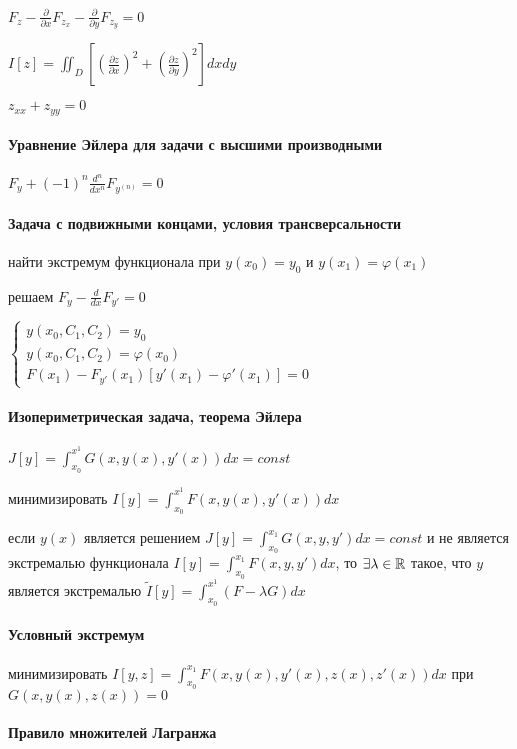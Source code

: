 \documentclass[russian,twocolumn]{article}
\begin{document}
$F_z - \frac{\partial}{\partial x}F_{z_x}-\frac{\partial}{\partial y}F_{z_y} = 0$

$I[z]=\iint_D [(\frac{\partial z}{\partial x})^2 + (\frac{\partial z}{\partial y})^2] dx dy$

$z_{xx} + z_{yy} = 0$

\paragraph{Уравнение Эйлера для задачи с высшими производными}

$F_y + (-1)^n \frac{d^n}{dx^n}F_{y^{(n)}}=0$

\paragraph{Задача с подвижными концами, условия трансверсальности}

найти экстремум функционала при $y(x_0) = y_0$ и $y(x_1) = \varphi(x_1)$

решаем $F_y - \frac{d}{dx}F_{y'}=0$

$\begin{cases}
y(x_0, C_1, C_2) = y_0 \\
y(x_0, C_1, C_2) = \varphi(x_0) \\
F(x_1)-F_{y'}(x_1)[y'(x_1)-\varphi'(x_1)] = 0
\end{cases}$

\paragraph{Изопериметрическая задача, теорема Эйлера}

$J[y]=\int_{x_0}^{x^1}G(x,y(x),y'(x))dx=const$

минимизировать $I[y]=\int_{x_0}^{x^1}F(x,y(x),y'(x))dx$
 
если $y(x)$ является решением $J[y]=\int_{x_0}^{x_1}G(x, y, y')dx = const$ и не является экстремалью функционала $I[y] = \int_{x_0}^{x_1}F(x, y, y')dx$, то $\exists \lambda \in \Bbb R$ такое, что $y$ является экстремалью $\widetilde{I}[y]=\int_{x_0}^{x^1}(F-\lambda G) dx$

\paragraph{Условный экстремум}

минимизировать $I[y,z] = \int_{x_0}^{x_1}F(x,y(x),y'(x),z(x),z'(x))dx$ при $G(x,y(x),z(x)) = 0$

\paragraph{Правило множителей Лагранжа}
\end{document}
